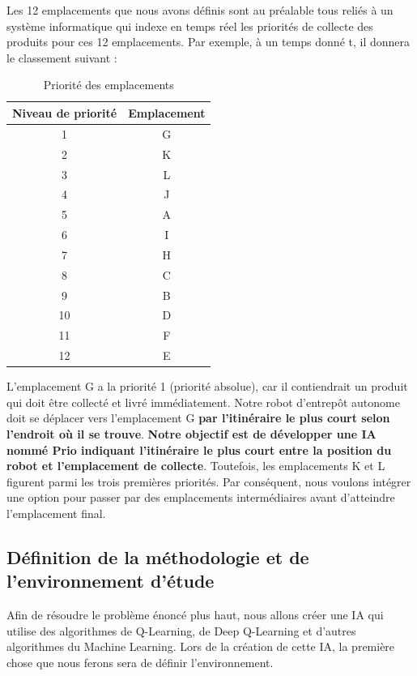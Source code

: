 \documentclass{article}
\begin{document}
Les 12 emplacements que nous avons définis sont au préalable tous reliés à un système informatique qui indexe en temps réel les priorités de collecte des produits pour ces 12 emplacements. Par exemple, à un temps donné t, il donnera le classement suivant :

\begin{table}[H]
    \centering
    \begin{tabular}{|c|c|}
        \hline
        Niveau de priorité & Emplacement \\
        \hline
        1 & G \\
	\hline
        2 & K \\
	\hline
        3 & L \\
	\hline
        4 & J \\
	\hline
        5 & A \\
	\hline
        6 & I \\
	\hline
        7 & H \\
	\hline
        8 & C \\
	\hline
        9 & B \\
	\hline
        10 & D \\
	\hline
        11 & F \\
	\hline
        12 & E \\
        \hline
    \end{tabular}
    \caption{Priorité des emplacements}
\end{table}

L'emplacement G a la priorité 1 (priorité absolue), car il contiendrait un produit qui doit être collecté et livré immédiatement. Notre robot d'entrepôt autonome doit se déplacer vers l'emplacement G \textbf{par l'itinéraire le plus court selon l'endroit où il se trouve}. \textbf{Notre objectif est de développer une IA nommé Prio  indiquant l'itinéraire le plus court entre la position du robot et l’emplacement de collecte}. Toutefois, les emplacements K et L figurent parmi les trois premières priorités. Par conséquent, nous voulons intégrer une option pour passer par des emplacements intermédiaires avant d'atteindre l'emplacement final.

\subsection{Définition de la méthodologie et de l'environnement d'étude}
Afin de résoudre le problème énoncé plus haut, nous allons créer une IA qui utilise des algorithmes de Q-Learning, de Deep Q-Learning et d'autres algorithmes du Machine Learning. Lors de la création de cette IA, la première chose que nous ferons sera de définir l'environnement.
\end{document}
